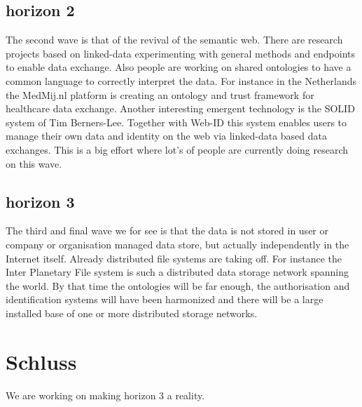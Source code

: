 \documentclass{article}
\begin{document}
\subsection{horizon 2}
The second wave is that of the revival of the semantic web. There are research projects based on linked-data experimenting with general methods and endpoints to enable data exchange. Also people are working on shared ontologies to have a common language to correctly interpret the data. For instance in the Netherlands the MedMij.nl platform is creating an ontology and trust framework for healthcare data exchange. Another interesting emergent technology is the SOLID system of Tim Berners-Lee. Together with Web-ID this system enables users to manage their own data and identity on the web via linked-data based data exchanges. This is a big effort where lot's of people are currently doing research on this wave.

\subsection{horizon 3}
The third and final wave we for see is that the data is not stored in user or company or organisation managed data store, but actually independently in the Internet itself. Already distributed file systems are taking off. For instance the Inter Planetary File system is such a distributed data storage network spanning the world. By that time the ontologies will be far enough, the authorisation and identification systems will have been harmonized and there will be a large installed base of one or more distributed storage networks.

\section{Schluss}
We are working on making horizon 3 a reality.



\end{document}
